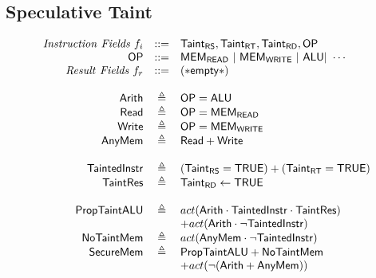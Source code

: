 \documentclass[12pt, letterpaper]{article}
\begin{document}
      \subsection{Speculative Taint}

      \cite{2019stt}
      \[
      \begin{array}{r c l}
        \mathit{Instruction\ Fields}\ f_i &::=& \mathsf{Taint_{RS}}, \mathsf{Taint_{RT}}, \mathsf{Taint_{RD}}, \mathsf{OP}\\
        \mathsf{OP} &::=& \mathsf{MEM_{READ}}\ |\ \mathsf{MEM_{WRITE}}\ |\ \mathsf{ALU} |\ \cdots \\
        \mathit{Result\ Fields}\ f_r &::=& \mathsf{(*empty*)}\\\\

        \mathsf{Arith}   &\triangleq& \mathsf{OP} = \mathsf{ALU}\\
        \mathsf{Read}    &\triangleq& \mathsf{OP} = \mathsf{MEM_{READ}}\\
        \mathsf{Write}   &\triangleq& \mathsf{OP} = \mathsf{MEM_{WRITE}}\\
        \mathsf{AnyMem}  &\triangleq& \mathsf{Read} + \mathsf{Write}\\\\

        \mathsf{TaintedInstr} &\triangleq& ( \mathsf{Taint_{RS}} = \mathsf{TRUE} ) + ( \mathsf{Taint_{RT}} = \mathsf{TRUE} )\\
        \mathsf{TaintRes}     &\triangleq& \mathsf{Taint_{RD}} \leftarrow \mathsf{TRUE}\\\\

        \mathsf{PropTaintALU} &\triangleq&
          act(\mathsf{Arith}\cdot \mathsf{TaintedInstr}\cdot \mathsf{TaintRes})\\
          &&+
          act(\mathsf{Arith}\cdot \neg \mathsf{TaintedInstr})\\
        \mathsf{NoTaintMem} &\triangleq&
          act(\mathsf{AnyMem}\cdot \neg \mathsf{TaintedInstr})\\
        \mathsf{SecureMem} &\triangleq& \mathsf{PropTaintALU} + \mathsf{NoTaintMem}\\
          &&+
          act(\neg (\mathsf{Arith} + \mathsf{AnyMem}))
      \end{array}
      \]\\


  \clearpage
    
    
\end{document}

